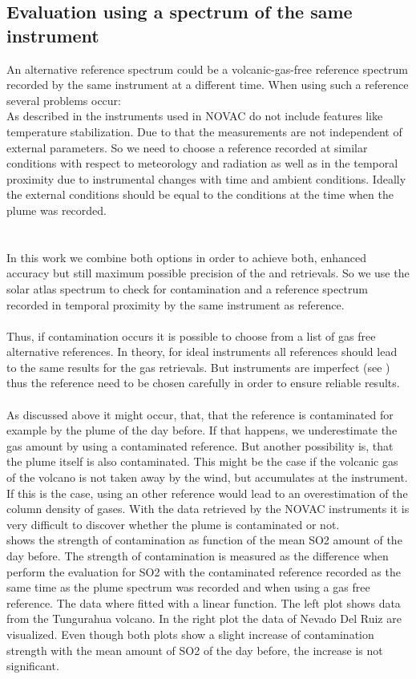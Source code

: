 \subsection*{Evaluation using a spectrum of the same instrument}
An alternative reference spectrum could be a volcanic-gas-free reference
spectrum recorded by the same instrument at a different time. When using such a reference several problems occur:\\
As described in  the instruments used in NOVAC do not include features like temperature stabilization. Due to that the measurements are not independent of external parameters. 
So we need to choose a reference recorded at similar conditions with respect to meteorology and	radiation as well as in the temporal proximity due to instrumental changes with time and ambient conditions. Ideally the external conditions should be equal to the conditions at the time when the plume was recorded.\\
\\
%
\\
In this work we combine both options in order to
achieve both, enhanced accuracy but still maximum possible precision of
the  and  retrievals. So we use the solar atlas spectrum to check for 
contamination and a reference spectrum recorded in temporal proximity by the same instrument as reference.\\
\\
Thus, if contamination occurs it is possible to choose from a list of gas free alternative references. In theory, for ideal instruments all references should lead to the same results for the gas retrievals. But instruments are imperfect (see ) thus the reference need to be chosen carefully in order to ensure reliable results.\\
%
\\
As discussed above it might occur, that, that the reference is contaminated for example by the plume of the day before. If that happens, we underestimate the gas amount by using a contaminated reference. But another possibility is, that the plume itself is also contaminated. This might be the case if the volcanic gas of the volcano is not taken away by the wind, but accumulates at the instrument. If this is the case, using an other reference would lead to an overestimation of the column density of gases. With the data retrieved by the NOVAC instruments it is very difficult to discover whether the plume is contaminated or not. \\
 shows the strength of contamination as function of the mean SO2 amount of the day before. The strength of contamination is  measured as the difference when perform the evaluation for SO2 with the contaminated reference recorded as the same time as the plume spectrum was recorded and when using a gas free reference. The data where fitted with a linear function. The left plot shows data from the Tungurahua volcano. In the right plot the data of Nevado Del Ruiz are visualized. Even though both plots show a slight increase of contamination strength with the mean amount of SO2 of the day before, the increase is not significant.\\
